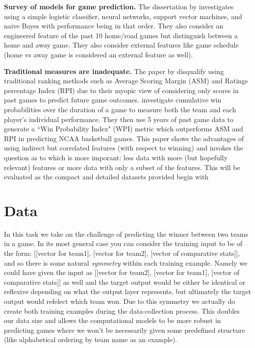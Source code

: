 \documentclass{article} %
\begin{document}
\textbf{Survey of models for game prediction.}  The dissertation by \citet{cao2012sports} investigates using a simple logistic classifier, neural networks, support vector machines, and naive Bayes with performance being in that order.  They also consider an engineered feature of the past 10 home/road games but distinguish between a home and away game.  They also consider external features like game schedule (home vs away game is considered an external feature as well).

\textbf{Traditional measures are inadequate.}  The paper by \citet{bashuk2012using} disqualify using traditional ranking methods such as Average Scoring Margin (ASM) and Ratings percentage Index (RPI) due to their myopic view of considering only scores in past games to predict future game outcomes.  \citet{bashuk2012using} investigate cumulative win probabilities over the duration of a game to measure both the team and each player's individual performance.  They then use 5 years of past game data to generate a ``Win Probability Index" (WPI) metric which outperforms ASM and RPI in predicting NCAA basketball games.  This paper shows the advantages of using indirect but correlated features (with respect to winning) and invokes the question as to which is more imporant: less data with more (but hopefully relevant) features or more data with only a subset of the features.  This will be evaluated as the compact and detailed datasets provided begin with


\section{Data}
\label{sec:data}

In this task we take on the challenge of predicting the winner between two teams in a game.  In its most general case you can consider the training input to be of the form: [[vector for team1], [vector for team2], [vector of comparative stats]], and so there is some natural \textit{symmetry} within each training example.  Namely we could have given the input as [[vector for team2], [vector for team1], [vector of comparative stats]] as well and the target output would be either be identical or reflexive depending on what the output layer represents, but ultimately the target output would refelect which team won.  Due to this symmetry we actually do create both training examples during the data-collection process.  This doubles our data size and allows the computational models to be more robust in predicting games where we won't be necessarily given some predefined structure (like alphabetical ordering by team name as an example).
\end{document}
